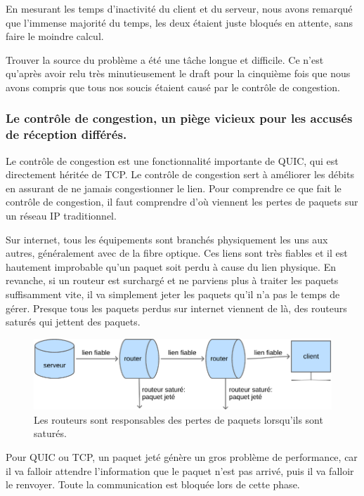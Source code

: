\vspace{0.5cm}

En mesurant les temps d'inactivité du client et du serveur, nous avons remarqué que l'immense majorité du temps, les deux étaient juste bloqués en attente, sans faire le moindre calcul.

Trouver la source du problème a été une tâche longue et difficile. Ce n'est qu'après avoir relu très minutieusement le draft pour la cinquième fois que nous avons compris que tous nos soucis étaient causé par le contrôle de congestion.

\subsubsection{Le contrôle de congestion, un piège vicieux pour les accusés de réception différés.}

Le contrôle de congestion est une fonctionnalité importante de QUIC, qui est directement héritée de TCP. Le contrôle de congestion sert à améliorer les débits en assurant de ne jamais congestionner le lien.
Pour comprendre ce que fait le contrôle de congestion, il faut comprendre d'où viennent les pertes de paquets sur un réseau IP traditionnel.

Sur internet, tous les équipements sont branchés physiquement les uns aux autres, généralement avec de la fibre optique. Ces liens sont très fiables et il est hautement improbable qu'un paquet soit perdu à cause du lien physique. En revanche, si un routeur est surchargé et ne parviens plus à traiter les paquets suffisamment vite, il va simplement jeter les paquets qu'il n'a pas le temps de gérer.
Presque tous les paquets perdus sur internet viennent de là, des routeurs saturés qui jettent des paquets.

\begin{figure}[H]
    \centering
    \includegraphics[width=\textwidth]{figures/routers_dropping_packets.png}
    \caption{Les routeurs sont responsables des pertes de paquets lorsqu'ils sont saturés.}
\end{figure}

Pour QUIC ou TCP, un paquet jeté génère un gros problème de performance, car il va falloir attendre l'information que le paquet n'est pas arrivé, puis il va falloir le renvoyer. Toute la communication est bloquée lors de cette phase.

